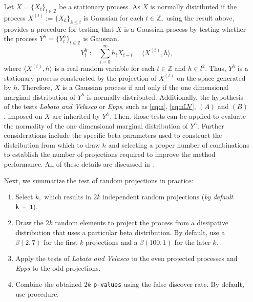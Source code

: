 Let \(X = \{X_t\}_{t\in\mathbb{Z}}\) be a stationary process. As \(X\) is normally distributed if the process \(X^{(t)} := \{X_k\}_{k \leq t}\) is Gaussian for each \(t\in\mathbb{Z},\) using the result above, \citet{nietoreyes2014} provides a procedure for testing that \(X\) is a Gaussian process by testing whether the process \(Y^h = \{Y^h_t\}_{t \in \mathbb{Z}}\) is Gaussian.
\begin{equation}
 Y^h_t := \sum_{i=0}^\infty h_i X_{t-i} = \langle X^{ (t) },h \rangle, \label{eq:proj}
\end{equation}
where \(\langle X^{(t)},h \rangle\) is a real random variable for each \(t \in \mathbb{Z}\) and \(h\in l^2\). Thus, \(Y^h\) is a stationary process constructed by the projection of \(X^{(t)}\) on the space generated by \(h.\) Therefore, \(X\) is a Gaussian process if and only if the one dimensional marginal distribution of \(Y^{h}\) is normally distributed. Additionally, the hypothesis of the tests \emph{Lobato and Velasco} or \emph{Epps}, such as \eqref{eq:a}, \eqref{eq:aLV}, \((A)\) and \((B)\), imposed on \(X\) are inherited by \(Y^h\). Then, those tests can be applied to evaluate the normality of the one dimensional marginal distribution of \(Y^h\). Further considerations include the specific beta parameters used to construct the distribution from which to draw \(h\) and selecting a proper number of combinations to establish the number of projections required to improve the method performance. All of these details are discussed in \citet{nietoreyes2014}.

Next, we summarize the test of random projections in practice:

\begin{enumerate}
\def\labelenumi{\arabic{enumi}.}
\item
  Select \(k,\) which results in \(2k\) independent random projections (\emph{by default} \texttt{k\ =\ 1}).
\item
  Draw the \(2k\) random elements to project the process from a dissipative distribution that uses a particular beta distribution. By default, use a \(\beta(2,7)\) for the first \(k\) projections and a \(\beta(100,1)\) for the later \(k\).
\item
  Apply the tests of \emph{Lobato and Velasco} to the even projected processes and \emph{Epps} to the odd projections.
\item
  Combine the obtained \(2k\) \texttt{p-values} using the false discover rate. By default, use \citet{Benjamin2001} procedure.
\end{enumerate}

